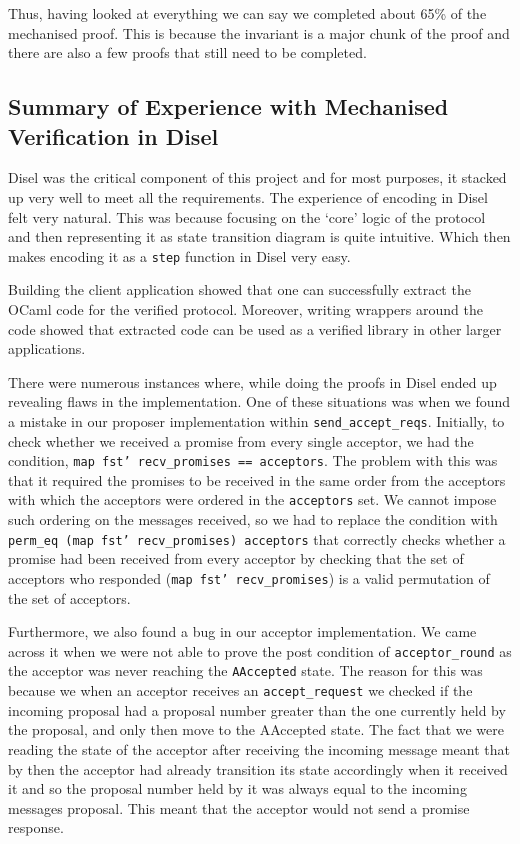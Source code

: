 Thus, having looked at everything we can say we completed about 65\% of
the mechanised proof. This is because the invariant is a major chunk of
the proof and there are also a few proofs that still need to be completed.

\subsection{Summary of Experience with Mechanised Verification in Disel}
Disel was the critical component of this project and for most purposes, it
stacked up very well to meet all the requirements.
The experience of encoding in Disel felt very natural. This was because
focusing on the `core' logic of the protocol and then representing it
as state transition diagram is quite intuitive. Which then makes
encoding it as a \texttt{step} function in Disel very easy.

Building the client application showed that one can successfully extract
the OCaml code for the verified protocol. Moreover, writing wrappers
around the code showed that extracted code can be used as a verified library
in other larger applications.

There were numerous instances where, while doing the proofs in Disel
ended up revealing flaws in the implementation. One of these situations was
when we found a mistake in our proposer implementation within
\texttt{send\_accept\_reqs}. Initially, to check
whether we received a promise from every single acceptor, we had the condition,
\texttt{map fst' recv\_promises == acceptors}. The problem with this was that
it required the promises to be received in the same order from the acceptors
with which the acceptors were ordered in the \texttt{acceptors} set. We cannot impose
such ordering on the messages received, so we had to replace the condition
with \texttt{perm\_eq (map fst' recv\_promises) acceptors} that correctly checks
whether a promise had been received from every acceptor by checking that
the set of acceptors who responded (\texttt{map fst' recv\_promises}) is
a valid permutation of the set of acceptors.

Furthermore, we also found a bug in our acceptor implementation. We came
across it when we were not able to prove the post condition of \texttt{acceptor\_round}
as the acceptor was never reaching the \texttt{AAccepted} state.
The reason for this was because we when an acceptor receives an \texttt{accept\_request}
we checked if the incoming proposal had a proposal number greater than the one
currently held by the proposal, and only then move to the AAccepted state. The fact
that we were reading the state of the acceptor after receiving the incoming message
meant that by then the acceptor had already transition its state accordingly
when it received it and so the proposal number held by it was always
equal to the incoming messages proposal. This meant that the acceptor would not
send a promise response.

